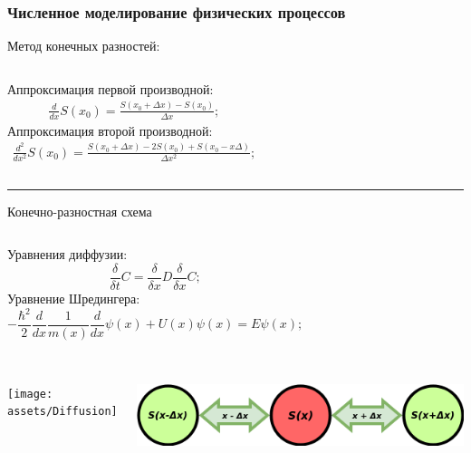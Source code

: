 \documentclass[10pt,pdf,hyperref={unicode},aspectratio={169}]{beamer}
\begin{document}
\begin{frame}
	\frametitle{Численное моделирование физических процессов}
	\centering
	{\color{blue} Метод конечных разностей:}
	\begin{columns}
		\centering
			{\color{red}Аппроксимация первой производной:}
			\small
			\begin{gather*}
				\frac{d}{dx}S(x_{0}) = \frac{S(x_{0} + \Delta x) - S(x_{0})}{\Delta x };
			\end{gather*}
		\centering
		{\color{red}Аппроксимация второй производной:}
			\small
			\begin{gather*}
				\frac{d^{2}}{dx^{2}}S(x_{0})  = \frac{S(x_{0} + \Delta x) - 2S(x_{0}) + S(x_{0} - x \Delta)}{ \Delta x ^{2}};
			\end{gather*}
	\end{columns}
\rule{ \textwidth}{0.5mm}
{\color{blue} Конечно-разностная схема}
	\begin{columns}
	\column{0.4\textwidth}
		\centering
		{\color{red}Уравнения диффузии:}
		\begin{equation*}
			\frac{\delta}{\delta t} C = \frac{\delta}{\delta x}D\frac{\delta}{\delta x} C;
		\end{equation*}
	\column{0.6\textwidth}
		\centering
		{\color{red}Уравнение Шредингера:}
		\begin{equation*}
			-\frac{\hbar^{2}}{2}\frac{d}{dx}\frac{1}{m(x)}\frac{d}{dx}\psi(x) + U(x)\psi(x) = E\psi(x);
		\end{equation*}\\
	\end{columns}

	\begin{columns}
		\begin{center}
			\texttt{[image: assets/Diffusion]}
		\end{center}
		\begin{center}
			\includegraphics[width=.7\textwidth]{assets/Approx}
		\end{center}
	\end{columns}

\end{frame}
\end{document}
